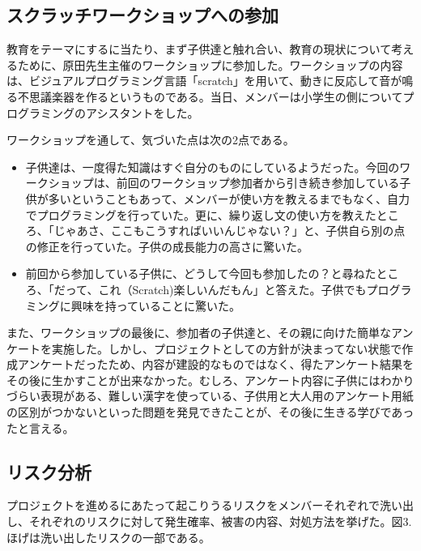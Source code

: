 \documentclass[openany,11pt,papersize]{jsbook}
\begin{document}
\subsection{スクラッチワークショップへの参加}
\par 教育をテーマにするに当たり、まず子供達と触れ合い、教育の現状について考えるために、原田先生主催のワークショップに参加した。ワークショップの内容は、ビジュアルプログラミング言語「scratch」を用いて、動きに反応して音が鳴る不思議楽器を作るというものである。当日、メンバーは小学生の側についてプログラミングのアシスタントをした。
\par ワークショップを通して、気づいた点は次の2点である。
\begin{itemize}
\item 子供達は、一度得た知識はすぐ自分のものにしているようだった。今回のワークショップは、前回のワークショップ参加者から引き続き参加している子供が多いということもあって、メンバーが使い方を教えるまでもなく、自力でプログラミングを行っていた。更に、繰り返し文の使い方を教えたところ、「じゃあさ、ここもこうすればいいんじゃない？」と、子供自ら別の点の修正を行っていた。子供の成長能力の高さに驚いた。
\item 前回から参加している子供に、どうして今回も参加したの？と尋ねたところ、「だって、これ（Scratch)楽しいんだもん」と答えた。子供でもプログラミングに興味を持っていることに驚いた。
\end{itemize}

\par また、ワークショップの最後に、参加者の子供達と、その親に向けた簡単なアンケートを実施した。しかし、プロジェクトとしての方針が決まってない状態で作成アンケートだったため、内容が建設的なものではなく、得たアンケート結果をその後に生かすことが出来なかった。むしろ、アンケート内容に子供にはわかりづらい表現がある、難しい漢字を使っている、子供用と大人用のアンケート用紙の区別がつかないといった問題を発見できたことが、その後に生きる学びであったと言える。


\subsection{リスク分析}
\par プロジェクトを進めるにあたって起こりうるリスクをメンバーそれぞれで洗い出し、それぞれのリスクに対して発生確率、被害の内容、対処方法を挙げた。図3.ほげは洗い出したリスクの一部である。
\end{document}
